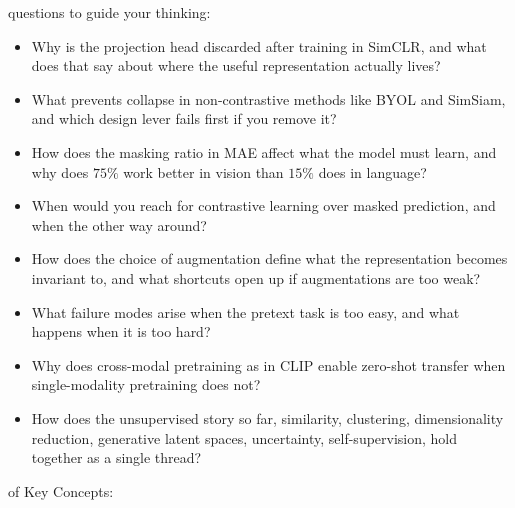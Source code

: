  questions to guide your thinking:

\begin{itemize}
    \item Why is the projection head discarded after training in SimCLR, and what does that say about where the useful representation actually lives?
    \item What prevents collapse in non-contrastive methods like BYOL and SimSiam, and which design lever fails first if you remove it?
    \item How does the masking ratio in MAE affect what the model must learn, and why does $75\%$ work better in vision than $15\%$ does in language?
    \item When would you reach for contrastive learning over masked prediction, and when the other way around?
    \item How does the choice of augmentation define what the representation becomes invariant to, and what shortcuts open up if augmentations are too weak?
    \item What failure modes arise when the pretext task is too easy, and what happens when it is too hard?
    \item Why does cross-modal pretraining as in CLIP enable zero-shot transfer when single-modality pretraining does not?
    \item How does the unsupervised story so far, similarity, clustering, dimensionality reduction, generative latent spaces, uncertainty, self-supervision, hold together as a single thread?
\end{itemize}

 of Key Concepts:

